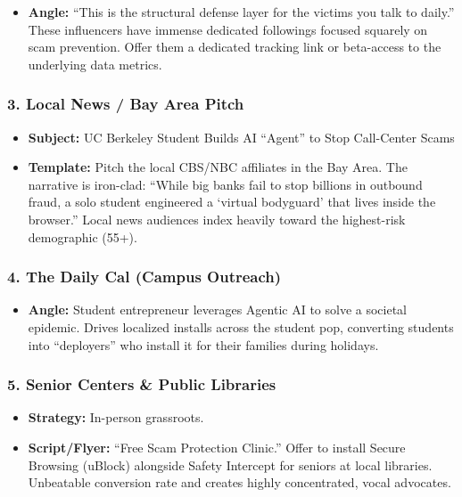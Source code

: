 \documentclass[
]{article}
\providecommand{\tightlist}{%
  \setlength{\itemsep}{0pt}\setlength{\parskip}{0pt}}
\begin{document}
\begin{itemize}
\tightlist
\item
  \textbf{Angle:} ``This is the structural defense layer for the victims
  you talk to daily.'' These influencers have immense dedicated
  followings focused squarely on scam prevention. Offer them a dedicated
  tracking link or beta-access to the underlying data metrics.
\end{itemize}

\subsubsection{3. Local News / Bay Area
Pitch}\label{local-news-bay-area-pitch}

\begin{itemize}
\tightlist
\item
  \textbf{Subject:} UC Berkeley Student Builds AI ``Agent'' to Stop
  Call-Center Scams
\item
  \textbf{Template:} Pitch the local CBS/NBC affiliates in the Bay Area.
  The narrative is iron-clad: ``While big banks fail to stop billions in
  outbound fraud, a solo student engineered a `virtual bodyguard' that
  lives inside the browser.'' Local news audiences index heavily toward
  the highest-risk demographic (55+).
\end{itemize}

\subsubsection{4. The Daily Cal (Campus
Outreach)}\label{the-daily-cal-campus-outreach}

\begin{itemize}
\tightlist
\item
  \textbf{Angle:} Student entrepreneur leverages Agentic AI to solve a
  societal epidemic. Drives localized installs across the student pop,
  converting students into ``deployers'' who install it for their
  families during holidays.
\end{itemize}

\subsubsection{5. Senior Centers \& Public
Libraries}\label{senior-centers-public-libraries}

\begin{itemize}
\tightlist
\item
  \textbf{Strategy:} In-person grassroots.
\item
  \textbf{Script/Flyer:} ``Free Scam Protection Clinic.'' Offer to
  install Secure Browsing (uBlock) alongside Safety Intercept for
  seniors at local libraries. Unbeatable conversion rate and creates
  highly concentrated, vocal advocates.
\end{itemize}
\end{document}
